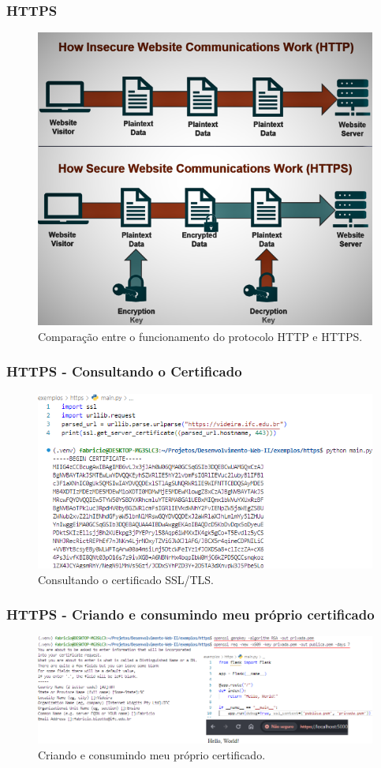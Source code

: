 \documentclass[
	10pt, %
	t, %
]{beamer}
\begin{document}
\begin{frame}
	\frametitle{HTTPS}

	\begin{figure}
		\centering
		\includegraphics[width=0.65\linewidth]{http_https.png}
		\caption{Comparação entre o funcionamento do protocolo HTTP e HTTPS.}
		\label{fig:https}
	\end{figure}

\end{frame}

\begin{frame}
	\frametitle{HTTPS - Consultando o Certificado}

	\begin{figure}
		\centering
		\includegraphics[width=0.9\linewidth]{ssl_consulta.png}
		\caption{Consultando o certificado SSL/TLS.}
		\label{fig:https_ssl}
	\end{figure}

\end{frame}


\begin{frame}
	\frametitle{HTTPS - Criando e consumindo meu próprio certificado}

	\begin{figure}
		\centering
		\includegraphics[width=0.9\linewidth]{ssl_python_example.png}
		\caption{Criando e consumindo meu próprio certificado.}
		\label{fig:https_ssl_example}
	\end{figure}

\end{frame}
\end{document}
